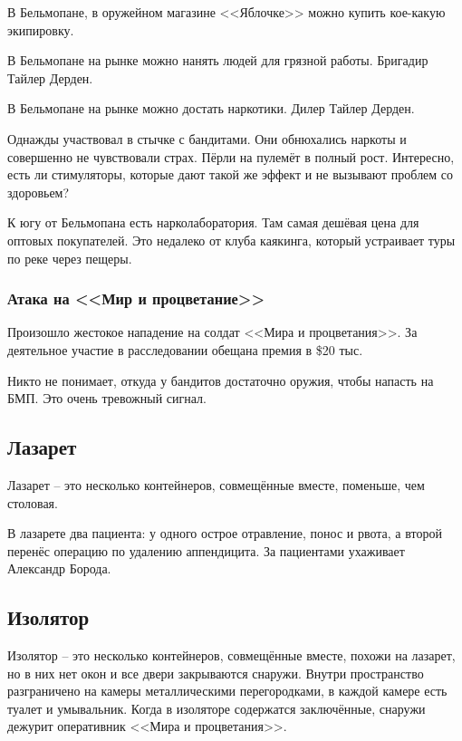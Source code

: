 \documentclass{article}
\begin{document}
В Бельмопане, в оружейном магазине <<Яблочке>> можно купить кое-какую
экипировку.

В Бельмопане на рынке можно нанять людей для грязной работы. Бригадир
Тайлер Дерден.

В Бельмопане на рынке можно достать наркотики. Дилер Тайлер Дерден.

Однажды участвовал в стычке с бандитами. Они обнюхались наркоты и
совершенно не чувствовали страх. Пёрли на пулемёт в полный рост.
Интересно, есть ли стимуляторы, которые дают такой же эффект и не
вызывают проблем со здоровьем?

К югу от Бельмопана есть нарколаборатория. Там самая дешёвая цена для
оптовых покупателей. Это недалеко от клуба каякинга, который устраивает
туры по реке через пещеры.

\subsubsection{Атака на <<Мир и
процветание>>}\label{pap-under-attack}

Произошло жестокое нападение на солдат <<Мира и процветания>>. За
деятельное участие в расследовании обещана премия в \$20 тыс.

Никто не понимает, откуда у бандитов достаточно оружия, чтобы напасть на
БМП. Это очень тревожный сигнал.

\subsection{Лазарет}\label{infirmary}

Лазарет -- это несколько контейнеров, совмещённые вместе, поменьше, чем
столовая.

В лазарете два пациента: у одного острое отравление, понос и рвота, а
второй перенёс операцию по удалению аппендицита. За пациентами ухаживает
Александр Борода.

\subsection{Изолятор}\label{brig}

Изолятор -- это несколько контейнеров, совмещённые вместе, похожи на
лазарет, но в них нет окон и все двери закрываются снаружи. Внутри
пространство разграничено на камеры металлическими перегородками, в
каждой камере есть туалет и умывальник. Когда в изоляторе содержатся
заключённые, снаружи дежурит оперативник <<Мира и процветания>>.
\end{document}
